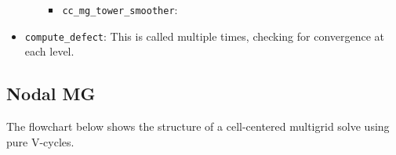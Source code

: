 \begin{itemize}
\begin{itemize}
\begin{itemize}
  \item{} {\tt cc\_mg\_tower\_smoother}:
  \end{itemize}

\end{itemize}
\item {\tt compute\_defect}: This is called multiple times, checking for
   convergence at each level.


\end{itemize}



\subsection{Nodal MG}

The flowchart below shows the structure of a cell-centered multigrid
solve using pure V-cycles.


